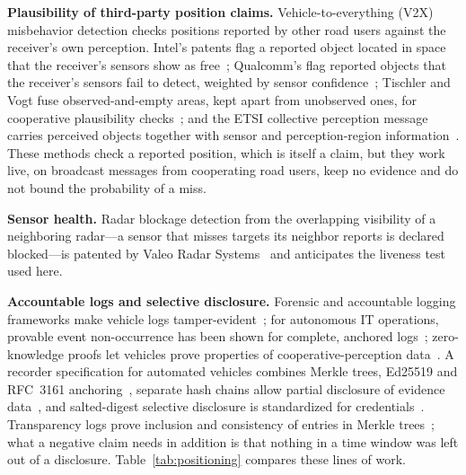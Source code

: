 \textbf{Plausibility of third-party position claims.} Vehicle-to-everything (V2X) misbehavior detection checks positions reported by other road users against the receiver's own perception. Intel's patents flag a reported object located in space that the receiver's sensors show as free~\cite{b24,b25}; Qualcomm's flag reported objects that the receiver's sensors fail to detect, weighted by sensor confidence~\cite{b26,b27}; Tischler and Vogt fuse observed-and-empty areas, kept apart from unobserved ones, for cooperative plausibility checks~\cite{b28}; and the ETSI collective perception message carries perceived objects together with sensor and perception-region information~\cite{b29}. These methods check a reported position, which is itself a claim, but they work live, on broadcast messages from cooperating road users, keep no evidence and do not bound the probability of a miss.

\textbf{Sensor health.} Radar blockage detection from the overlapping visibility of a neighboring radar---a sensor that misses targets its neighbor reports is declared blocked---is patented by Valeo Radar Systems~\cite{b33} and anticipates the liveness test used here.

\textbf{Accountable logs and selective disclosure.} Forensic and accountable logging frameworks make vehicle logs tamper-evident~\cite{b34,b35}; for autonomous IT operations, provable event non-occurrence has been shown for complete, anchored logs~\cite{b36}; zero-knowledge proofs let vehicles prove properties of cooperative-perception data~\cite{b37,b38}. A recorder specification for automated vehicles combines Merkle trees, Ed25519 and RFC~3161 anchoring~\cite{b39}, separate hash chains allow partial disclosure of evidence data~\cite{b40}, and salted-digest selective disclosure is standardized for credentials~\cite{b41}. Transparency logs prove inclusion and consistency of entries in Merkle trees~\cite{b62}; what a negative claim needs in addition is that nothing in a time window was left out of a disclosure. Table~\ref{tab:positioning} compares these lines of work.

